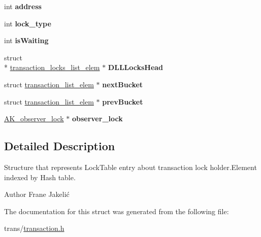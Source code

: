 \begin{DoxyCompactItemize}
\item 
\hypertarget{structtransaction__list__elem_abcf5dc09e2f778fed1d8a7cf7055004f}{int {\bfseries address}}\label{structtransaction__list__elem_abcf5dc09e2f778fed1d8a7cf7055004f}

\item 
\hypertarget{structtransaction__list__elem_accb49854309cdff0a157d4ab01ac43fc}{int {\bfseries lock\+\_\+type}}\label{structtransaction__list__elem_accb49854309cdff0a157d4ab01ac43fc}

\item 
\hypertarget{structtransaction__list__elem_a0a732924a2e5cbe3b8568e0e5212f36e}{int {\bfseries is\+Waiting}}\label{structtransaction__list__elem_a0a732924a2e5cbe3b8568e0e5212f36e}

\item 
\hypertarget{structtransaction__list__elem_a441dcf09223b92668cadc49f88b08bc6}{struct \\*
\hyperlink{structtransaction__locks__list__elem}{transaction\+\_\+locks\+\_\+list\+\_\+elem} $\ast$ {\bfseries D\+L\+L\+Locks\+Head}}\label{structtransaction__list__elem_a441dcf09223b92668cadc49f88b08bc6}

\item 
\hypertarget{structtransaction__list__elem_a87886aa53e90ddd43a7b6c774c2b801f}{struct \hyperlink{structtransaction__list__elem}{transaction\+\_\+list\+\_\+elem} $\ast$ {\bfseries next\+Bucket}}\label{structtransaction__list__elem_a87886aa53e90ddd43a7b6c774c2b801f}

\item 
\hypertarget{structtransaction__list__elem_aac101a113a925aa7e9dd75fc15563204}{struct \hyperlink{structtransaction__list__elem}{transaction\+\_\+list\+\_\+elem} $\ast$ {\bfseries prev\+Bucket}}\label{structtransaction__list__elem_aac101a113a925aa7e9dd75fc15563204}

\item 
\hypertarget{structtransaction__list__elem_a419ed68310e5b4fffd6629af6512a320}{\hyperlink{structobserver__lock}{A\+K\+\_\+observer\+\_\+lock} $\ast$ {\bfseries observer\+\_\+lock}}\label{structtransaction__list__elem_a419ed68310e5b4fffd6629af6512a320}

\end{DoxyCompactItemize}


\subsection{Detailed Description}
Structure that represents Lock\+Table entry about transaction lock holder.\+Element indexed by Hash table. 

\begin{DoxyAuthor}{Author}
Frane Jakelić 
\end{DoxyAuthor}


The documentation for this struct was generated from the following file\+:\begin{DoxyCompactItemize}
\item 
trans/\hyperlink{transaction_8h}{transaction.\+h}\end{DoxyCompactItemize}
